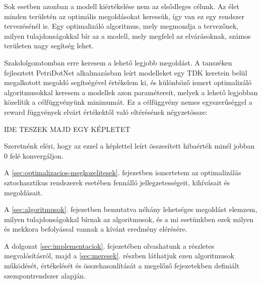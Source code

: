 Sok esetben azonban a modell kiértékelése nem az elsődleges célunk. Az élet minden területén az optimális megoldásokat keressük, így van ez egy rendszer tervezésénél is. Egy optimalizáló algoritmus, mely megmondja a tervezőnek, milyen tulajdonságokkal bír az a modell, mely megfelel az elvárásoknak, számos területen nagy segítség lehet.

Szakdolgozatomban erre keresem a lehető legjobb megoldást. A tanszéken fejlesztett PetriDotNet alkalmazásban leírt modelleket egy TDK keretein belül megalkotott megoldó\cite{SpdnTDK} segítségével értékelem ki, és különböző ismert optimalizáló algoritmusokkal keresem a modellek azon paramétereit, melyek a lehető legjobban közelítik a célfüggvényünk minimumát. Ez a célfüggvény nemes egyszerűséggel a reward függvények elvárt értékektől való eltérésének négyzetössze:

IDE TESZEK MAJD EGY KÉPLETET

Szeretnénk eléri, hogy az ezzel a képlettel leírt összesített hibaérték minél jobban 0 felé konvergáljon.

A \ref{sec:optimalizacios-megkozelitesek}. fejezetben ismertetem az optimalizálás sztochasztikus rendszerek esetében fennálló jellegzetességeit, kihívásait és megoldásait.

A \ref{sec:algoritmusok}. fejezetben bemutatva néhány lehetséges megoldást elemzem, milyen tulajdonságokkal bírnak az algoritmusok, és a mi esetünkben ezek milyen és mekkora befolyással vannak a kívánt eredmény elérésére.

A dolgozat \ref{sec:implementaciok}. fejezetében olvashatunk a részletes megvalósításról, majd a \ref{sec:meresek}. részben láthatjuk ezen algoritmusok működését, értékelését és összehasonlítását a megelőző fejezetekben definiált szempontrendszer alapján.


